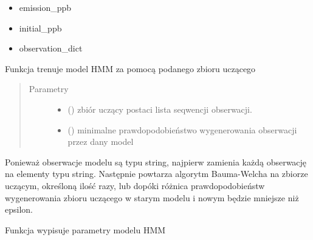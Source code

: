 \documentclass[letterpaper,10pt,polish]{sphinxmanual}
\begin{document}
\begin{fulllineitems}
\begin{fulllineitems}
\begin{description}
\begin{itemize}
\item {} 
emission\_ppb

\item {} 
initial\_ppb

\item {} 
observation\_dict

\end{itemize}

\end{description}

\end{fulllineitems}


\begin{fulllineitems}
\label{\detokenize{HMM:HMM.HMM.learn}}
Funkcja trenuje model HMM za pomocą podanego zbioru uczącego
\begin{quote}\begin{description}
\item[{Parametry}] \leavevmode\begin{itemize}
\item {} 
 () \textendash{} zbiór uczący postaci lista seqwencji obserwacji.

\item {} 
 () \textendash{} minimalne prawdopodobieństwo wygenerowania obserwacji przez dany model

\end{itemize}

\end{description}\end{quote}

Ponieważ obserwacje modelu są typu string, najpierw zamienia każdą obserwację na elementy typu string.
Następnie powtarza algorytm Bauma-Welcha na zbiorze uczącym, określoną ilość razy, lub dopóki różnica
prawdopodobieństw wygenerowania zbioru uczącego w starym modelu i nowym będzie mniejsze niż epsilon.

\end{fulllineitems}


\begin{fulllineitems}
\label{\detokenize{HMM:HMM.HMM.print_params}}
Funkcja wypisuje parametry modelu HMM

\end{fulllineitems}


\end{fulllineitems}
\end{document}
